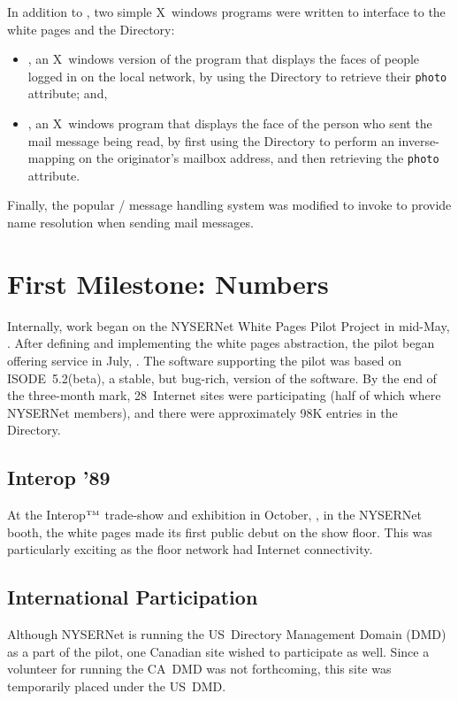 In addition to ,
two simple X~windows programs were written to interface to the white pages and
the Directory:
\begin{itemize}
\item	{}, an X~windows version of the  program that
	displays the faces of people logged in on the local network,
	by using the Directory to retrieve their \verb"photo" attribute;
	and,

\item	{}, an X~windows program that displays the face of the person
	who sent the mail message being read, by first using the Directory to
	perform an inverse-mapping on the originator's mailbox address, and
	then retrieving the \verb"photo" attribute.
\end{itemize}
Finally,
the popular \MH/ message handling system was modified to invoke  to
provide name resolution when sending mail messages.

\newpage
\section	{First Milestone: Numbers}
Internally,
work began on the NYSERNet White Pages Pilot Project in
mid-May, {}.
After defining and implementing the white pages abstraction,
the pilot began offering service in July, {}.
The software supporting the pilot was based on ISODE~5.2(beta),
a stable, but bug-rich, version of the software.
By the end of the three-month mark,
28~Internet sites were participating
(half of which where NYSERNet members),
and there were approximately 98K entries in the Directory.

\subsection	{Interop '89}
At the Interop$^{\mbox{\tiny TM}}$ trade-show and exhibition in
October, {},
in the NYSERNet booth,
the white pages made its first public debut on the show floor.
This was particularly exciting as the floor network had Internet connectivity.

\subsection	{International Participation}
Although NYSERNet is running the US~Directory Management Domain (DMD) as a
part of the pilot,
one Canadian site wished to participate as well.
Since a volunteer for running the CA~DMD was not forthcoming,
this site was temporarily placed under the US~DMD.

